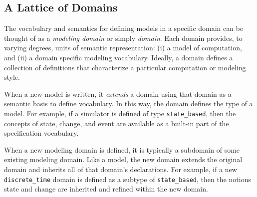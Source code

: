 \documentclass[12pt]{article}
\newcommand{\nael}[1]{\color{blue}{ \em #1 }\color{black}}
\renewcommand{\nael}[1]{}
\begin{document}
\nael{We need a domain to use as our case study here and to ground the
  descriptions.  The call mentions electronic warfare (EW),
  Intelligence surveillance and reconnaisance (ISR) and strike (which
  I assume is what it sounds like.)  Examples of EW and ISR from a
  quick search and skim include UaVs interacting with manned systems.
  At one scale you have sensor data streaming with fine grained
  spatio-temporal resolution, and at another you are making tactical
  decisions at possibly much larger times and scales.}

\nael{From an AFOSR call on EW/ISR: ``The ultimate goal for airborne
  ISR and AEW/C2BM is to enable decision superiority and this will
  continue to be enabled by the confluence of hardware assets and the
  operators and analysts. Budgets will underpin the makeup of future
  capabilities and dictate the economics of introducing new platforms
  versus upgrading capabilities as existing platforms approach
  critical junctures in their operational lifecycle. In the case of
  radar systems, demand will come from existing platforms being
  retrofitted and upgraded, as well as opportunities from new manned
  and unmanned platforms, driving shipments a CAGR of 5 percent
  through 2022.''}

\subsection{A Lattice of Domains}

The vocabulary and semantics for defining models in a specific domain
can be thought of as a \emph{modeling domain} or simply \emph{domain}.
Each domain provides, to varying degrees, units of semantic
representation: (i) a model of computation, and (ii) a domain specific
modeling vocabulary.  Ideally, a domain defines a collection of
definitions that characterize a particular computation or modeling
style.

When a new model is written, it \emph{extends} a domain using that
domain as a semantic basis to define vocabulary.  In this way, the
domain defines the type of a model.  For example, if a simulator is
defined of type \lstinline!state_based!, then the concepts of state,
change, and event are available as a built-in part of the
specification vocabulary.

When a new modeling domain is defined, it is typically a subdomain of
some existing modeling domain.  Like a model, the new domain extends
the original domain and inherits all of that domain's declarations.
For example, if a new \lstinline!discrete_time! domain is defined as a
subtype of \lstinline!state_based!, then the notions state and change
are inherited and refined within the new domain.
\end{document}
